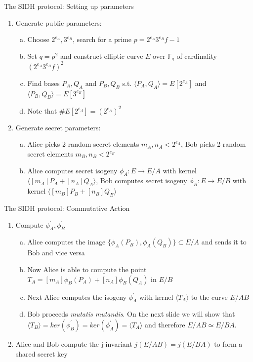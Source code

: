 \documentclass{beamer}
\begin{document}
\begin{frame}{The SIDH protocol: Setting up parameters}
\begin{enumerate}[1.]
	\item Generate public parameters:
	\begin{enumerate}[(a)]
		\item Choose $2^{e_A},3^{e_B}$, search for a prime $p=2^{e_A}3^{e_B}f- 1$\pause %
		\item Set $q=p^2$ and construct elliptic curve $E$ over $\mathbb{F}_q$ of cardinality $(2^{e_A}3^{e_B}f)^2$\pause %
		\item Find bases $P_A,Q_A$ and $P_B,Q_B$ s.t. $\langle P_A,Q_A\rangle = E[2^{e_A}]$ and $\langle P_B,Q_B\rangle = E[3^{e_B}]$ \pause  %
		\item Note that $\#E[2^{e_A}] =(2^{e_A})^2$
	\end{enumerate}
	\item Generate secret parameters:
	\begin{enumerate}[(a)]
		\item Alice picks 2 random secret elements $m_A,n_A < 2^{e_A}$, Bob picks 2 random secret elements $m_B,n_B < 2^{e_B}$\pause
		\item Alice computes secret isogeny $\phi_A : E \to E/A$ with kernel $\langle [m_A]P_A+[n_A]Q_A\rangle$, Bob computes secret isogeny $\phi_B : E \to E/B$ with kernel $\langle [m_B]P_B+[n_B]Q_B\rangle$
	\end{enumerate}

\end{enumerate}
\end{frame}

\begin{frame}{The SIDH protocol: Commutative Action}

\begin{enumerate}[1.]
	\item Compute $\phi_A^{\prime},\phi_B^{\prime}$

	\begin{enumerate}[(a)]
		\item Alice computes the image $\{\phi_A(P_B),\phi_A(Q_B)\} \subset E/A$ and sends it to Bob and vice versa\pause
		\item Now Alice is able to compute the point $T_A=[m_A]\phi_B(P_A) + [n_A]\phi_B(Q_A)$ in $E/B$\pause
		\item Next Alice computes the isogeny $\phi_A^{\prime}$ with kernel $\langle T_A \rangle$ to the curve $E/AB$\pause
		\item Bob proceeds \textit{mutatis mutandis}. On the next slide we will show that $\langle T_B \rangle  = ker(\phi_B^{\prime})=ker(\phi_A^{\prime})=\langle T_A \rangle$ and therefore $E/AB \simeq E/BA$.
	\end{enumerate}
	\item Alice and Bob compute the j-invariant $j(E/AB)=j(E/BA)$ to form a shared secret key 
\end{enumerate}
\end{frame}
\end{document}
